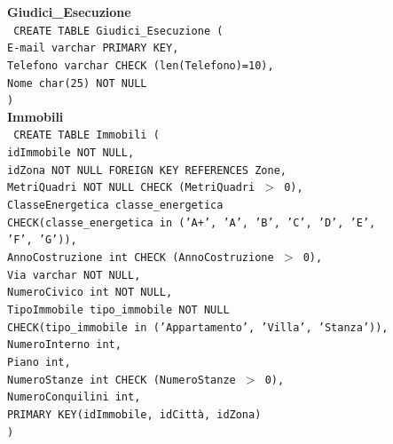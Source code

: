 \documentclass[a4paper,12pt]{report}
\begin{document}
                \noindent
                {\large \textbf{Giudici\_Esecuzione}} \\
                \texttt{
                    CREATE TABLE Giudici\_Esecuzione ( \\
                    \null\quad\quad E-mail      varchar     PRIMARY KEY, \\
                    \null\quad\quad Telefono    varchar     CHECK (len(Telefono)=10), \\
                    \null\quad\quad Nome        char(25)    NOT NULL \\
                    )
                } \\

                \noindent
                {\large \textbf{Immobili}} \\
                \texttt{
                    CREATE TABLE Immobili ( \\
                    \null\quad\quad idImmobile           NOT NULL, \\
                    \null\quad\quad idZona               NOT NULL               FOREIGN KEY REFERENCES Zone, \\
                    \null\quad\quad MetriQuadri          NOT NULL               CHECK (MetriQuadri $>$ 0), \\
                    \null\quad\quad ClasseEnergetica     classe\_energetica \\
                            \null\qquad\qquad CHECK(classe\_energetica in ('A+', 'A', 'B', 'C', 'D', 'E', \\
                            \null\qquad\qquad 'F', 'G')), \\
                    \null\quad\quad AnnoCostruzione      int                    CHECK (AnnoCostruzione $>$ 0), \\
                    \null\quad\quad Via                  varchar                NOT NULL, \\
                    \null\quad\quad NumeroCivico         int                    NOT NULL, \\
                    \null\quad\quad TipoImmobile         tipo\_immobile         NOT NULL \\
                            \null\qquad\qquad CHECK(tipo\_immobile in ('Appartamento', 'Villa', 'Stanza')), \\
                    \null\quad\quad NumeroInterno        int, \\
                    \null\quad\quad Piano                int, \\
                    \null\quad\quad NumeroStanze         int                    CHECK (NumeroStanze $>$ 0), \\
                    \null\quad\quad NumeroConquilini     int, \\
                    \null\quad\quad PRIMARY KEY(idImmobile, idCittà, idZona) \\
                    )
                } \\
\end{document}
